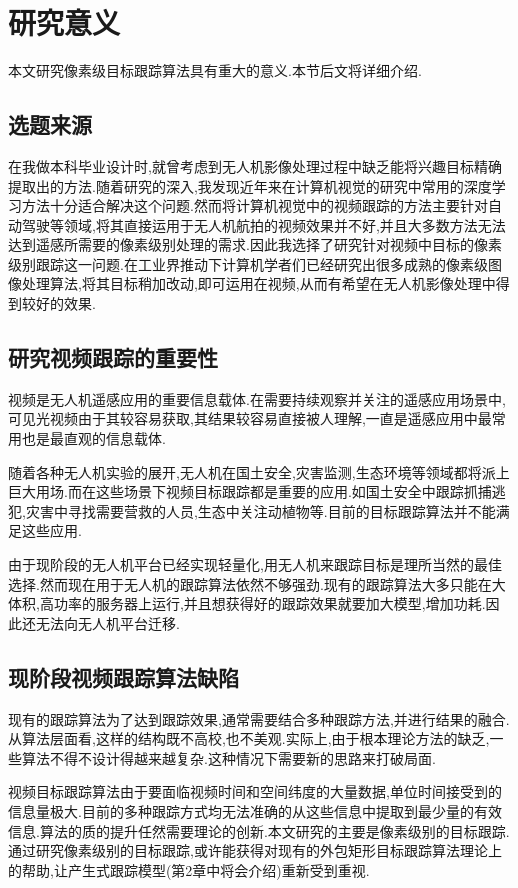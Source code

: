 \newpage
\section{研究意义}
本文研究像素级目标跟踪算法具有重大的意义.本节后文将详细介绍.
\subsection{选题来源}
在我做本科毕业设计\supercite{benchme}时,就曾考虑到无人机影像处理过程中缺乏能将兴趣目标精确提取出的方法.随着研究的深入,我发现近年来在计算机视觉的研究中常用的深度学习方法十分适合解决这个问题.然而将计算机视觉中的视频跟踪的方法主要针对自动驾驶等领域,将其直接运用于无人机航拍的视频效果并不好,并且大多数方法无法达到遥感所需要的像素级别处理的需求.因此我选择了研究针对视频中目标的像素级别跟踪这一问题.在工业界推动下计算机学者们已经研究出很多成熟的像素级图像处理算法,将其目标稍加改动,即可运用在视频,从而有希望在无人机影像处理中得到较好的效果.

\subsection{研究视频跟踪的重要性}
视频是无人机遥感应用的重要信息载体.在需要持续观察并关注的遥感应用场景中,可见光视频由于其较容易获取,其结果较容易直接被人理解,一直是遥感应用中最常用也是最直观的信息载体.
\par
随着各种无人机实验的展开,无人机在国土安全,灾害监测,生态环境等领域都将派上巨大用场.而在这些场景下视频目标跟踪都是重要的应用.如国土安全中跟踪抓捕逃犯,灾害中寻找需要营救的人员,生态中关注动植物等.目前的目标跟踪算法并不能满足这些应用.
\par
由于现阶段的无人机平台已经实现轻量化,用无人机来跟踪目标是理所当然的最佳选择.然而现在用于无人机的跟踪算法依然不够强劲.现有的跟踪算法大多只能在大体积,高功率的服务器上运行,并且想获得好的跟踪效果就要加大模型,增加功耗.因此还无法向无人机平台迁移.

\subsection{现阶段视频跟踪算法缺陷}
现有的跟踪算法为了达到跟踪效果,通常需要结合多种跟踪方法,并进行结果的融合.从算法层面看,这样的结构既不高校,也不美观.实际上,由于根本理论方法的缺乏,一些算法不得不设计得越来越复杂.这种情况下需要新的思路来打破局面.
\par
视频目标跟踪算法由于要面临视频时间和空间纬度的大量数据,单位时间接受到的信息量极大.目前的多种跟踪方式均无法准确的从这些信息中提取到最少量的有效信息.算法的质的提升任然需要理论的创新.本文研究的主要是像素级别的目标跟踪.通过研究像素级别的目标跟踪,或许能获得对现有的外包矩形目标跟踪算法理论上的帮助,让产生式跟踪模型(第2章中将会介绍)重新受到重视.

